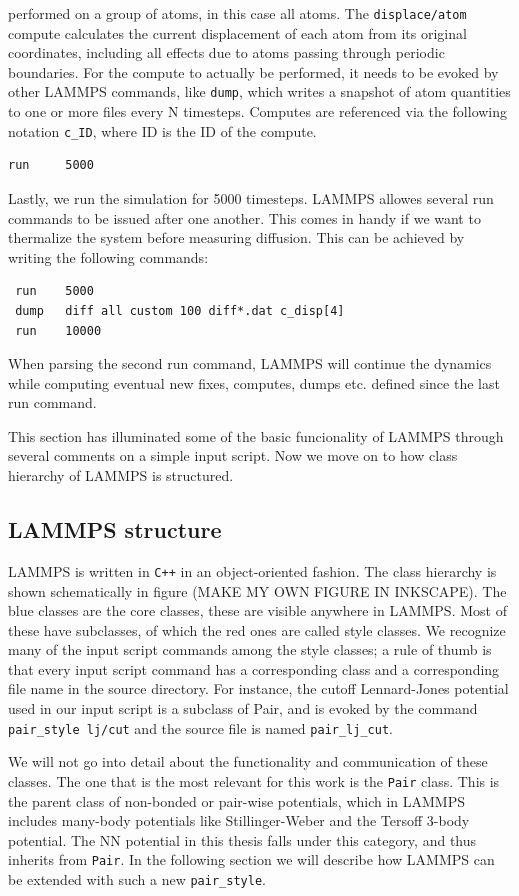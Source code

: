 \documentclass[twoside,english]{uiofysmaster}
\begin{document}
performed on a group of atoms, in this case all atoms.
The \texttt{displace/atom} compute calculates the current
displacement of each atom from its original
coordinates, including all effects due to atoms
passing through periodic boundaries.
For the compute to actually be performed, it needs
to be evoked by other LAMMPS commands, like \texttt{dump}, 
which writes a snapshot of atom quantities to one 
or more files every N timesteps. Computes are 
referenced via the following notation \texttt{c\_ID}, where
ID is the ID of the compute. 
\begin{lstlisting}
run		5000
\end{lstlisting}
Lastly, we run the simulation for 5000 timesteps. 
LAMMPS allowes several run commands to be issued
after one another. This comes in handy if we want
to thermalize the system before measuring diffusion.
This can be achieved by writing the following commands:
\begin{lstlisting}
 run 	5000
 dump 	diff all custom 100 diff*.dat c_disp[4]
 run 	10000
\end{lstlisting}
When parsing the second run command, LAMMPS will
continue the dynamics while computing eventual
new fixes, computes, dumps etc. defined since
the last run command. 

This section has illuminated some of the basic
funcionality of LAMMPS through several comments
on a simple input script. Now we move on to
how class hierarchy of LAMMPS is structured. 

\subsection{LAMMPS structure}
LAMMPS is written in \texttt{C++} in an object-oriented
fashion. The class hierarchy is shown schematically
in figure (MAKE MY OWN FIGURE IN INKSCAPE). 
The blue classes are the core classes, these
are visible anywhere in LAMMPS.
Most of these have subclasses, of which the red ones
are called style classes. We recognize many 
of the input script commands among the style
classes; a rule of thumb is that every input script
command has a corresponding class and a
corresponding file name in the source directory. 
For instance, the cutoff Lennard-Jones potential
used in our input script is a subclass of Pair,
and is evoked by the command
\texttt{pair\_style lj/cut} and the source file is named
\texttt{pair\_lj\_cut}. 

We will not go into detail about the functionality
and communication of these classes. The one
that is the most relevant for this work is the \texttt{Pair} class. 
This is the parent class of non-bonded or pair-wise potentials, which
in LAMMPS includes many-body potentials like Stillinger-Weber and 
the Tersoff 3-body potential. The NN potential in this thesis falls 
under this category, and thus inherits from \texttt{Pair}. 
In the following section we will describe how 
LAMMPS can be extended with such a new \texttt{pair\_style}.
\end{document}
